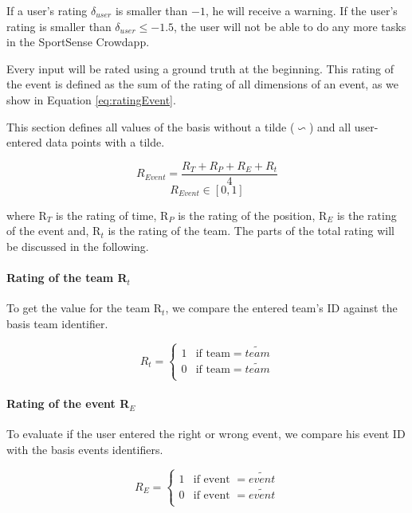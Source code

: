 If a user's rating $\delta_{user}$ is smaller than $-1$, he will receive a warning.
If the user's rating is smaller than $\delta_{user} \le -1.5$, the user will not be able to do any more tasks in the SportSense Crowdapp.


Every input will be rated using a ground truth at the beginning. This rating of the event is defined as the sum of the rating of all dimensions of an event, as we show in Equation \ref{eq:ratingEvent}.
\newline

This section defines all values of the basis without a tilde ($\backsim$) and all user-entered data points with a tilde.

\begin{equation}\label{eq:ratingEvent}
	R_{Event}=\frac{R_{T}+R_{P}+R_{E}+R_{t}}{4}
\end{equation}
$$R_{Event} \in [0,1]$$

where R$_{T}$ is the rating of time, R$_{P}$ is the rating of the position, R$_{E}$ is the rating of the event and, R$_{t}$ is the rating of the team. The parts of the total rating will be discussed in the following.

\paragraph{Rating of the team R$_{t}$}
To get the value for the team R$_{t}$, we compare the entered team's ID against the basis team identifier.

\begin{equation}
	R_{t} =
	\begin{cases}
		1	& \text{if team} =  \widetilde{team}\\
		0	& \text{if team} = \widetilde{team} \\
   \end{cases}
\end{equation}


\paragraph{Rating of the event R$_{E}$}
To evaluate if the user entered the right or wrong event, we compare his event ID with the basis events identifiers.

\begin{equation}
	R_{E} =
	\begin{cases}
		1	& \text{if event } =  \widetilde{event}\\
		0	& \text{if event } = \widetilde{event} \\
   \end{cases}
\end{equation}



